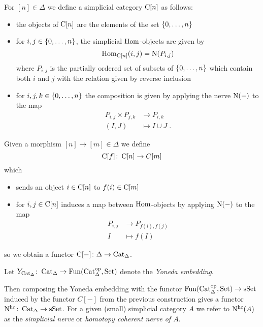 \begin{construction}
    For $[n]\in\Delta$ we define a simplicial category $\operatorname{C}[n]$ as follows:
    \begin{itemize}
        \item the objects of $\operatorname{C}[n]$ are the elements of the set $\left\lbrace0,\ldots,n\right\rbrace$
        \item for $i,j\in\left\lbrace0,\ldots,n\right\rbrace$, the simplicial $\operatorname{Hom}$-objects are given by 
            \begin{equation*}
                \operatorname{Hom}_{\operatorname{C}[n]}(i,j)=\operatorname{N}(P_{i,j})
            \end{equation*}
            where $P_{i,j}$ is the partially ordered set of subsets of $\left\lbrace0,\ldots,n\right\rbrace$ which contain both $i$ and $j$ with the relation given by reverse inclusion
        \item for $i,j,k\in\left\lbrace0,\ldots,n\right\rbrace$ the composition is given by applying the nerve $\operatorname{N}(-)$ to the map
        \begin{align*}
                P_{i,j}\times P_{j,k}&\to P_{i,k}\\
                (I,J)&\mapsto I\cup J\;.
        \end{align*}
    \end{itemize}
    Given a morphism $[n]\to[m]\in\Delta$ we define
    \begin{equation*}
        \operatorname{C}[f]\colon\operatorname{C}[n]\to C[m]
    \end{equation*}
    which
    \begin{itemize}
        \item sends an object $i\in\operatorname{C}[n]$ to $f(i)\in\operatorname{C}[m]$
        \item for $i,j\in\operatorname{C}[n]$ induces a map between $\operatorname{Hom}$-objects by applying $\operatorname{N}(-)$ to the map
            \begin{align*}
                P_{i,j}&\to P_{f(i),f(j)}\\
                I&\mapsto f(I)
            \end{align*}
    \end{itemize}
    so we obtain a functor $\operatorname{C}[-]\colon\Delta\to\operatorname{Cat}_{\Delta}$.
    \begin{reference}
        \cite[Notation 2.4.3.1]{kerodon}
    \end{reference}
\end{construction}
\begin{definition} %
    Let $Y_{\operatorname{Cat}_{\Delta}}\colon\operatorname{Cat}_{\Delta}\to\operatorname{Fun}(\operatorname{Cat}_{\Delta}^{\operatorname{op}},\operatorname{Set})$ denote the \emph{Yoneda embedding}.
    
    Then composing the Yoneda embedding with the functor $\operatorname{Fun}(\operatorname{Cat}_{\Delta}^{\operatorname{op}},\operatorname{Set})\to\operatorname{sSet}$ induced by the functor $C[-]$ from the previous construction gives a functor $\operatorname{N^{hc}}\colon\operatorname{Cat}_{\Delta}\to\operatorname{sSet}$.
    For a given (small) simplicial category $A$ we refer to $\operatorname{N^{hc}}(A)$ as the \emph{simplicial nerve} or \emph{homotopy coherent nerve of $A$}.
\end{definition}
